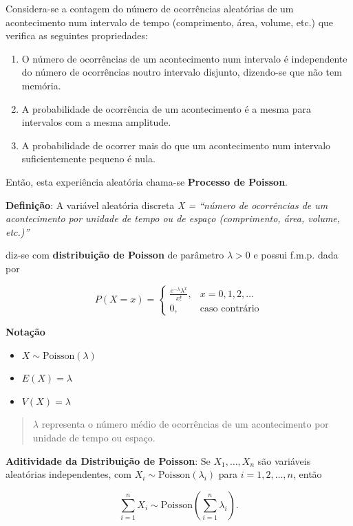 \documentclass[
]{book}
\providecommand{\tightlist}{%
  \setlength{\itemsep}{0pt}\setlength{\parskip}{0pt}}
\begin{document}
Considera-se a contagem do número de ocorrências aleatórias de um acontecimento num intervalo de tempo (comprimento, área, volume, etc.) que verifica as seguintes propriedades:

\begin{enumerate}
\def\labelenumi{\arabic{enumi}.}
\item
  O número de ocorrências de um acontecimento num intervalo é independente do número de ocorrências noutro intervalo disjunto, dizendo-se que não tem memória.
\item
  A probabilidade de ocorrência de um acontecimento é a mesma para intervalos com a mesma amplitude.
\item
  A probabilidade de ocorrer mais do que um acontecimento num intervalo suficientemente pequeno é nula.
\end{enumerate}

Então, esta experiência aleatória chama-se \textbf{Processo de Poisson}.

\textbf{Definição}: A variável aleatória discreta \emph{X = ``número de ocorrências de um acontecimento por unidade de tempo ou de espaço (comprimento, área, volume, etc.)''}

diz-se com \textbf{distribuição de Poisson} de parâmetro \(\lambda > 0\) e possui f.m.p. dada por

\[
P(X = x) = \begin{cases} 
\frac{e^{-\lambda} \lambda^x}{x!}, & x = 0, 1, 2, \dots \\
0, & \text{caso contrário}
\end{cases}
\]

\textbf{Notação}

\begin{itemize}
\tightlist
\item
  \(X \sim \text{Poisson}(\lambda)\)
\item
  \(E(X) = \lambda\)
\item
  \(V(X) = \lambda\)
\end{itemize}

\begin{quote}
\(\lambda\) representa o número médio de ocorrências de um acontecimento por unidade de tempo ou espaço.
\end{quote}

\textbf{Aditividade da Distribuição de Poisson}: Se \(X_1, \dots, X_n\) são variáveis aleatórias independentes, com \(X_i \sim \text{Poisson}(\lambda_i)\) para \(i = 1, 2, \dots, n\), então

\[
\sum_{i=1}^n X_i \sim \text{Poisson}\left( \sum_{i=1}^n \lambda_i \right).
\]
\end{document}
